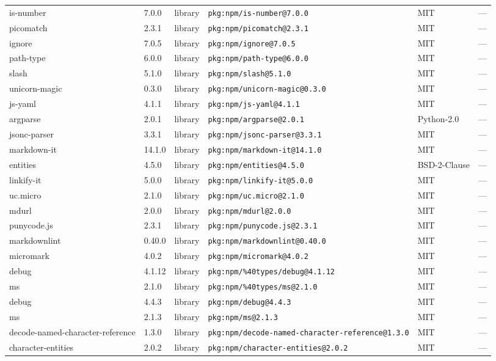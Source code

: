 \documentclass[11pt]{article}
\begin{document}
\begin{longtable}{|l|l|l|p{2.2cm}|l|p{4cm}|}
is-number & 7.0.0 & library & \texttt{pkg:npm/is-number@7.0.0} & MIT & — \\
picomatch & 2.3.1 & library & \texttt{pkg:npm/picomatch@2.3.1} & MIT & — \\
ignore & 7.0.5 & library & \texttt{pkg:npm/ignore@7.0.5} & MIT & — \\
path-type & 6.0.0 & library & \texttt{pkg:npm/path-type@6.0.0} & MIT & — \\
slash & 5.1.0 & library & \texttt{pkg:npm/slash@5.1.0} & MIT & — \\
unicorn-magic & 0.3.0 & library & \texttt{pkg:npm/unicorn-magic@0.3.0} & MIT & — \\
js-yaml & 4.1.1 & library & \texttt{pkg:npm/js-yaml@4.1.1} & MIT & — \\
argparse & 2.0.1 & library & \texttt{pkg:npm/argparse@2.0.1} & Python-2.0 & — \\
jsonc-parser & 3.3.1 & library & \texttt{pkg:npm/jsonc-parser@3.3.1} & MIT & — \\
markdown-it & 14.1.0 & library & \texttt{pkg:npm/markdown-it@14.1.0} & MIT & — \\
entities & 4.5.0 & library & \texttt{pkg:npm/entities@4.5.0} & BSD-2-Clause & — \\
linkify-it & 5.0.0 & library & \texttt{pkg:npm/linkify-it@5.0.0} & MIT & — \\
uc.micro & 2.1.0 & library & \texttt{pkg:npm/uc.micro@2.1.0} & MIT & — \\
mdurl & 2.0.0 & library & \texttt{pkg:npm/mdurl@2.0.0} & MIT & — \\
punycode.js & 2.3.1 & library & \texttt{pkg:npm/punycode.js@2.3.1} & MIT & — \\
markdownlint & 0.40.0 & library & \texttt{pkg:npm/markdownlint@0.40.0} & MIT & — \\
micromark & 4.0.2 & library & \texttt{pkg:npm/micromark@4.0.2} & MIT & — \\
debug & 4.1.12 & library & \texttt{pkg:npm/\%40types/debug@4.1.12} & MIT & — \\
ms & 2.1.0 & library & \texttt{pkg:npm/\%40types/ms@2.1.0} & MIT & — \\
debug & 4.4.3 & library & \texttt{pkg:npm/debug@4.4.3} & MIT & — \\
ms & 2.1.3 & library & \texttt{pkg:npm/ms@2.1.3} & MIT & — \\
decode-named-character-reference & 1.3.0 & library & \texttt{pkg:npm/decode-named-character-reference@1.3.0} & MIT & — \\
character-entities & 2.0.2 & library & \texttt{pkg:npm/character-entities@2.0.2} & MIT & — \\

\end{longtable}
\end{document}
